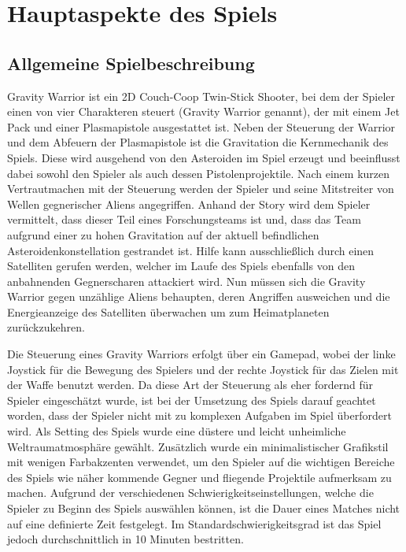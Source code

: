 \documentclass[11pt]{scrartcl}
\begin{document}
\newpage

\section{Hauptaspekte des Spiels}

\subsection{Allgemeine Spielbeschreibung}
Gravity Warrior ist ein 2D Couch-Coop Twin-Stick Shooter, bei dem der Spieler einen von vier Charakteren steuert (Gravity Warrior genannt), der mit einem Jet Pack und einer Plasmapistole ausgestattet ist. Neben der Steuerung der Warrior und dem Abfeuern der Plasmapistole ist die Gravitation die Kernmechanik des Spiels. Diese wird ausgehend von den Asteroiden im Spiel erzeugt und beeinflusst dabei sowohl den Spieler als auch dessen Pistolenprojektile. Nach einem kurzen Vertrautmachen mit der Steuerung werden der Spieler und seine Mitstreiter von Wellen gegnerischer Aliens angegriffen. Anhand der Story wird dem Spieler vermittelt, dass dieser Teil eines Forschungsteams ist und, dass das Team aufgrund einer zu hohen Gravitation auf der aktuell befindlichen Asteroidenkonstellation gestrandet ist. Hilfe kann ausschließlich durch einen Satelliten gerufen werden, welcher im Laufe des Spiels ebenfalls von den anbahnenden Gegnerscharen attackiert wird. Nun müssen sich die Gravity Warrior gegen unzählige Aliens behaupten, deren Angriffen ausweichen und die Energieanzeige des Satelliten überwachen um zum Heimatplaneten zurückzukehren.

Die Steuerung eines Gravity Warriors erfolgt über ein Gamepad, wobei der linke Joystick für die Bewegung des Spielers und der rechte Joystick für das Zielen mit der Waffe benutzt werden. Da diese Art der Steuerung als eher fordernd für Spieler eingeschätzt wurde, ist bei der Umsetzung des Spiels darauf geachtet worden, dass der Spieler nicht mit zu komplexen Aufgaben im Spiel überfordert wird. Als Setting des Spiels wurde eine düstere und leicht unheimliche Weltraumatmosphäre gewählt. Zusätzlich wurde ein minimalistischer Grafikstil mit wenigen Farbakzenten verwendet, um den Spieler auf die wichtigen Bereiche des Spiels wie näher kommende Gegner und fliegende Projektile aufmerksam zu machen. Aufgrund der verschiedenen Schwierigkeitseinstellungen, welche die Spieler zu Beginn des Spiels auswählen können, ist die Dauer eines Matches nicht auf eine definierte Zeit festgelegt. Im Standardschwierigkeitsgrad ist das Spiel jedoch durchschnittlich in 10 Minuten bestritten.
\end{document}
